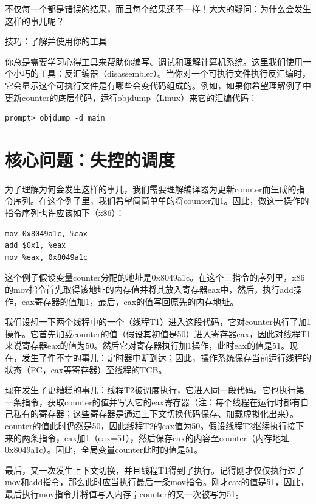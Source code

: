 不仅每一个都是错误的结果，而且每个结果还不一样！大大的疑问：为什么会发生这样的事儿呢？

\begin{tcolorbox}[colframe=grey,colback= grey,arc=0pt,left=6pt,right=6pt,top=6pt,bottom=6pt,boxsep=0pt]
\begin{center}技巧：了解并使用你的工具
\end{center}

你总是需要学习心得工具来帮助你编写、调试和理解计算机系统。这里我们使用一个小巧的工具：反汇编器（disassembler）。当你对一个可执行文件执行反汇编时，它会显示这个可执行文件是有哪些会变代码组成的。例如，如果你希望理解例子中更新counter的底层代码，运行objdump（Linux）来它的汇编代码：
\begin{verbatim}
prompt> objdump -d main
\end{verbatim}
\end{tcolorbox}

\section{核心问题：失控的调度}
为了理解为何会发生这样的事儿，我们需要理解编译器为更新counter而生成的指令序列。在这个例子里，我们希望简简单单的将counter加1。因此，做这一操作的指令序列也许应该如下（x86）：
\begin{verbatim}
mov 0x8049a1c, %eax
add $0x1, %eax
mov %eax, 0x8049a1c
\end{verbatim}

这个例子假设变量counter分配的地址是0x8049a1c。在这个三指令的序列里，x86的mov指令首先取得该地址的内存值并将其放入寄存器eax中，然后，执行add操作，eax寄存器的值加1，最后，eax的值写回原先的内存地址。

我们设想一下两个线程中的一个（线程T1）进入这段代码，它对counter执行了加1操作。它首先加载counter的值（假设其初值是50）进入寄存器eax，因此对线程T1来说寄存器eax的值为50。然后它对寄存器执行加1操作，此时eax的值是51。现在，发生了件不幸的事儿：定时器中断到达；因此，操作系统保存当前运行线程的状态（PC，eax等寄存器）至线程的TCB。

现在发生了更糟糕的事儿：线程T2被调度执行，它进入同一段代码。它也执行第一条指令，获取counter的值并写入它的eax寄存器（注：每个线程在运行时都有自己私有的寄存器；这些寄存器是通过上下文切换代码保存、加载虚拟化出来）。counter的值此时仍然是50，因此线程T2的eax值为50。假设线程T2继续执行接下来的两条指令，eax加1（eax=51），然后保存eax的内容至counter（内存地址0x8049a1c）。因此，全局变量counter此时的值是51。

最后，又一次发生上下文切换，并且线程T1得到了执行。记得刚才仅仅执行过了mov和add指令，那么此时应当执行最后一条mov指令。刚才eax的值是51，因此，最后执行mov指令并将值写入内存；counter的又一次被写为51。

